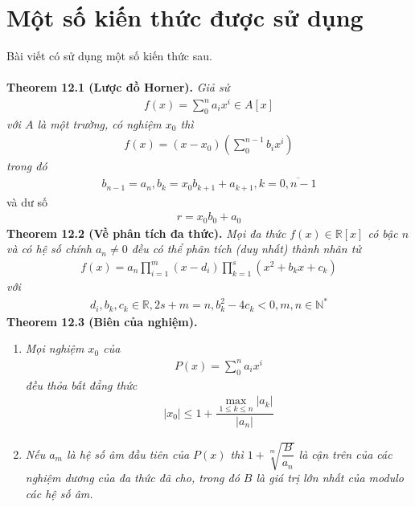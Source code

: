 \documentclass[a4paper,oneside]{book}
\numberwithin{equation}{chapter}
\begin{document}
\chapter{Một số kiến thức được sử dụng}
Bài viết có sử dụng một số kiến thức sau.\\
\\
\textbf{Theorem 12.1 (Lược đồ Horner).} \textit{Giả sử 
\begin{align}
f\left( x \right) = \sum\limits_0^n {{a_i}{x^i} \in A\left[ x \right]}
\end{align}
với $A$ là một trường, có nghiệm ${x_0}$ thì 
\begin{align}
f\left( x \right) = \left( {x - {x_0}} \right)\left( {\sum\limits_0^{n - 1} {{b_i}{x^i}} } \right)
\end{align}
trong đó}
\begin{align}
{b_{n - 1}} = {a_n},{b_k} = {x_0}{b_{k + 1}} + {a_{k + 1}},k = \overline {0,n - 1}
\end{align}
và dư số
\begin{align}
r = {x_0}{b_0} + {a_0}
\end{align}
\textbf{Theorem 12.2 (Về phân tích đa thức).} \textit{Mọi đa thức $f\left( x \right) \in \mathbb{R} \left[ x \right]$ có bậc $n$ và có hệ số chính ${a_n} \ne 0$ đều có thể phân tích (duy nhất) thành nhân tử
\begin{align}
f\left( x \right) = {a_n}\prod\limits_{i = 1}^m {\left( {x - {d_i}} \right)} \prod\limits_{k = 1}^s {\left( {{x^2} + {b_k}x + {c_k}} \right)} 
\end{align}
với}
\begin{align}
{d_i},{b_k},{c_k} \in \mathbb{R} ,2s + m = n,b_k^2 - 4{c_k} < 0,m,n{ \in \mathbb{N}^*}
\end{align}
\textbf{Theorem 12.3 (Biên của nghiệm).}
\begin{enumerate}
\item \textit{Mọi nghiệm ${x_0}$ của 
\begin{align}
P\left( x \right) = \sum\limits_0^n {{a_i}{x^i}} 
\end{align}
đều thỏa bất đẳng thức}
\begin{align}
\left| {{x_0}} \right| \le 1 + \dfrac{{\mathop {\max }\limits_{1 \le k \le n} \left| {{a_k}} \right|}}{{\left| {{a_n}} \right|}}
\end{align}
\item \textit{ Nếu ${a_m}$ là hệ số âm đầu tiên của $P\left( x \right)$ thì $1 + \sqrt[m]{{\dfrac{B}{{{a_n}}}}}$ là cận trên của các nghiệm dương của đa thức đã cho, trong đó $B$ là giá trị lớn nhất của modulo các hệ số âm.}
\end{enumerate}
\end{document}
